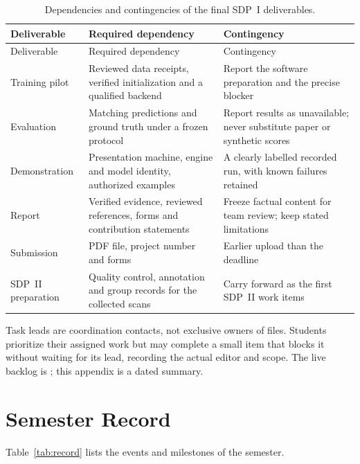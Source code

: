 \begingroup\tablesetup
\begin{longtable}{@{}L{0.18\textwidth}L{0.36\textwidth}L{0.38\textwidth}@{}}
\caption{Dependencies and contingencies of the final SDP~I deliverables.}\label{tab:dependencies}\\
\toprule Deliverable & Required dependency & Contingency\\\midrule\endfirsthead
\toprule Deliverable & Required dependency & Contingency\\\midrule\endhead
Training pilot & Reviewed data receipts, verified initialization and a qualified
backend & Report the software preparation and the precise blocker\\
Evaluation & Matching predictions and ground truth under a frozen protocol & Report
results as unavailable; never substitute paper or synthetic scores\\
Demonstration & Presentation machine, engine and model identity, authorized
examples & A clearly labelled recorded run, with known failures retained\\
Report & Verified evidence, reviewed references, forms and contribution
statements & Freeze factual content for team review; keep stated limitations\\
Submission & PDF file, project number and forms & Earlier upload than the deadline\\
SDP~II preparation & Quality control, annotation and group records for the
collected scans & Carry forward as the first SDP~II work items\\
\bottomrule
\end{longtable}
\endgroup

Task leads are coordination contacts, not exclusive owners of files. Students
prioritize their assigned work but may complete a small item that blocks it
without waiting for its lead, recording the actual editor and scope. The live
backlog is ; this appendix is a dated summary.

\section{Semester Record}
Table~\ref{tab:record} lists the events and milestones of the semester.

